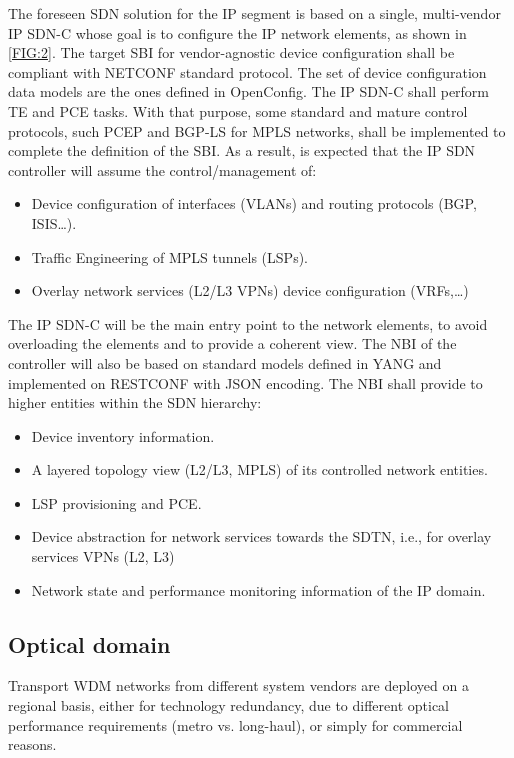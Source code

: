 \documentclass[a4paper,fleqn]{cas-dc}
\begin{document}
The foreseen SDN solution for the IP segment is based on a single, multi-vendor IP SDN-C whose goal is to configure the IP network elements, as shown in \cref{FIG:2}. The target SBI for vendor-agnostic device configuration shall be compliant with NETCONF standard protocol. The set of device configuration data models are the ones defined in OpenConfig. 
The IP SDN-C shall perform TE and PCE tasks. With that purpose, some standard and mature control protocols, such PCEP and BGP-LS for MPLS networks, shall be implemented to complete the definition of the SBI. As a result, is expected that the IP SDN controller will assume the control/management of:
\begin{itemize}
\item Device configuration of interfaces (VLANs) and routing protocols (BGP, ISIS…).
\item Traffic Engineering of MPLS tunnels (LSPs). 
\item Overlay network services (L2/L3 VPNs) device configuration (VRFs,\dots)
\end{itemize}

The IP SDN-C will be the main entry point to the network elements, to avoid overloading the elements and to provide a coherent view. The NBI of the controller will also be based on standard models defined in YANG and implemented on RESTCONF with JSON encoding. The NBI shall provide to higher entities within the SDN hierarchy:
\begin{itemize}
\item Device inventory information.
\item A layered topology view (L2/L3, MPLS) of its controlled network entities.
\item LSP provisioning and PCE.
\item Device abstraction for network services towards the SDTN, i.e., for overlay services VPNs (L2, L3)
\item Network state and performance monitoring information of the IP domain. 
\end{itemize}

\subsection{Optical domain}
\label{section:dwdm}
Transport WDM networks from different system vendors are deployed on a regional basis, either for technology redundancy, due to different optical performance requirements (metro vs. long-haul), or simply for commercial reasons. 
\end{document}
